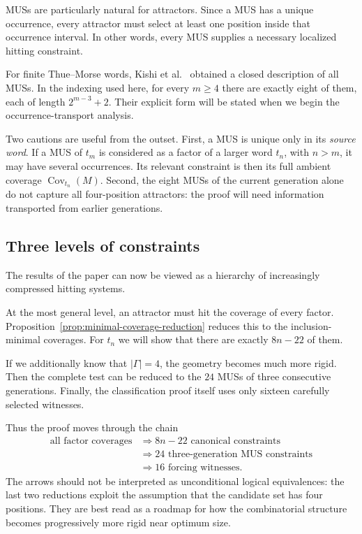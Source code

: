 \documentclass[11pt,a4paper]{article}
\theoremstyle{definition}\newtheorem{definition}[theorem]{Definition}
\theoremstyle{remark}\newtheorem{remark}[theorem]{Remark}
\newcommand{\Cov}{\operatorname{Cov}}
\begin{document}
MUSs are particularly natural for attractors. Since a MUS has a unique occurrence, every attractor must select at least one position inside that occurrence interval. In other words, every MUS supplies a necessary localized hitting constraint.

For finite Thue--Morse words, Kishi et al.~\cite{Kishi2026} obtained a closed description of all MUSs. In the indexing used here, for every $m\ge4$ there are exactly eight of them, each of length
$
2^{m-3}+2.
$
Their explicit form will be stated when we begin the occurrence-transport analysis.

Two cautions are useful from the outset. First, a MUS is unique only in its \emph{source word}. If a MUS of $t_m$ is considered as a factor of a larger word $t_n$, with $n>m$, it may have several occurrences. Its relevant constraint is then its full ambient coverage $\Cov_{t_n}(M)$. Second, the eight MUSs of the current generation alone do not capture all four-position attractors: the proof will need information transported from earlier generations.

\subsection{Three levels of constraints}
The results of the paper can now be viewed as a hierarchy of increasingly compressed hitting systems.

At the most general level, an attractor must hit the coverage of every factor. Proposition~\ref{prop:minimal-coverage-reduction} reduces this to the inclusion-minimal coverages. For $t_n$ we will show that there are exactly $8n-22$ of them.

If we additionally know that $|\Gamma|=4$, the geometry becomes much more rigid. Then the complete test can be reduced to the $24$ MUSs of three consecutive generations. Finally, the classification proof itself uses only sixteen carefully selected witnesses.

Thus the proof moves through the chain
\[
\begin{aligned}
\text{all factor coverages}
&\Longrightarrow 8n-22\text{ canonical constraints}\\
&\Longrightarrow 24\text{ three-generation MUS constraints}\\
&\Longrightarrow 16\text{ forcing witnesses}.
\end{aligned}
\]
The arrows should not be interpreted as unconditional logical equivalences: the last two reductions exploit the assumption that the candidate set has four positions. They are best read as a roadmap for how the combinatorial structure becomes progressively more rigid near optimum size.
\end{document}
